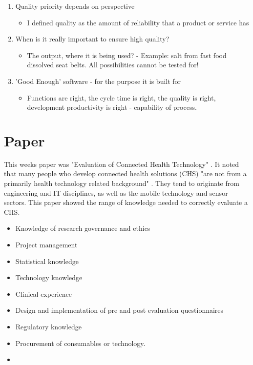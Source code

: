 \begin{enumerate}
\item Quality priority depends on perspective
\begin{itemize}
\item I defined quality as the amount of reliability that a product or service has
\end{itemize}
\item When is it really important to ensure high quality?
\begin{itemize}
\item The output, where it is being used? - Example: salt from fast food dissolved seat belts. All possibilities cannot be tested for!
\end{itemize}
\item 'Good Enough' software - for the purpose it is built for
\begin{itemize}
\item Functions are right, the cycle time is right, the quality is right, development productivity is right - capability of process.
\end{itemize}
\end{enumerate}

\section{Paper}

This weeks paper was "Evaluation of Connected Health Technology" \parencite{week2}. It noted that many people who develop connected health solutions (CHS) "are not from a primarily health technology related background" \parencite{week2}. They tend to originate from engineering and IT disciplines, as well as the mobile technology and sensor sectors. This paper showed the range of knowledge needed to correctly evaluate a CHS. 
\begin{itemize}
\item Knowledge of research governance and ethics
\item Project management
\item Statistical knowledge
\item Technology knowledge
\item Clinical experience
\item Design and implementation of pre and post evaluation questionnaires
\item Regulatory knowledge
\item Procurement of consumables or technology.
\item \parencite{week2}
\end{itemize}	

